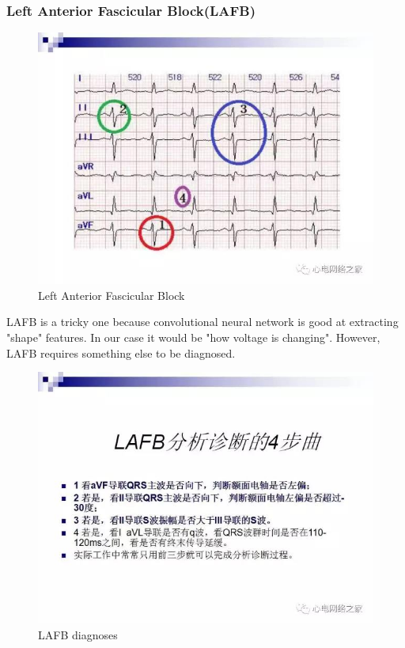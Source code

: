 \documentclass[%
 reprint,
 amsmath,amssymb,
 aps,
]{revtex4-2}
\begin{document}
\subsubsection{Left Anterior Fascicular Block(LAFB)}
\begin{figure}[H]
	\includegraphics[width=\linewidth]{img/LAFB1.jpg}
	\caption{\label{fig:lafb1} Left Anterior Fascicular Block \cite{Yu}}
\end{figure}
LAFB is a tricky one because convolutional neural network is good at extracting "shape" features. In our case it would be "how voltage is changing". However, LAFB requires something else to be diagnosed. 
\begin{figure}[H]
	\includegraphics[width=\linewidth]{img/LAFB2.jpg}
	\caption{\label{fig:lafb2} LAFB diagnoses \cite{Yu}}
\end{figure}
\end{document}
